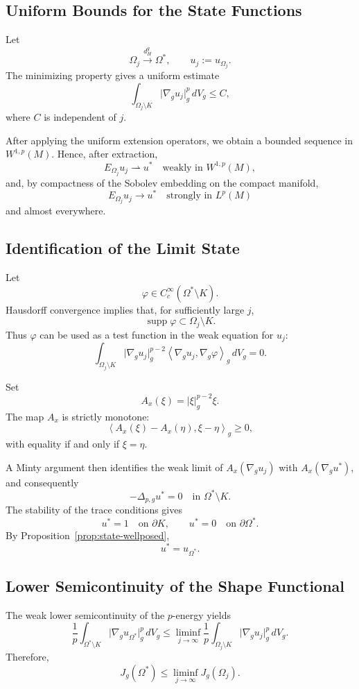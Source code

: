 \documentclass[11pt,a4paper]{article}
\theoremstyle{definition}
\theoremstyle{remark}
\newcommand{\gradg}{\nabla_g}
\newcommand{\plapg}{\Delta_{p,g}}
\newcommand{\normg}[1]{\lvert #1\rvert_g}
\newcommand{\ipg}[2]{\left\langle #1,#2\right\rangle_g}
\begin{document}
\subsection{Uniform Bounds for the State Functions}

Let
\[
\Omega_j\xrightarrow{d_H^g}\Omega^\ast,
\qquad
u_j:=u_{\Omega_j}.
\]
The minimizing property gives a uniform estimate
\begin{equation}
\int_{\Omega_j\setminus K}
\normg{\gradg u_j}^{p}\,dV_g
\leq C,
\label{eq:uniform-energy-bound}
\end{equation}
where $C$ is independent of $j$.

After applying the uniform extension operators, we obtain a bounded
sequence in $W^{1,p}(M)$. Hence, after extraction,
\[
E_{\Omega_j}u_j\rightharpoonup u^\ast
\quad\text{weakly in }W^{1,p}(M),
\]
and, by compactness of the Sobolev embedding on the compact manifold,
\[
E_{\Omega_j}u_j\to u^\ast
\quad\text{strongly in }L^p(M)
\]
and almost everywhere.

\subsection{Identification of the Limit State}

Let
\[
\varphi\in C_c^\infty(\Omega^\ast\setminus K).
\]
Hausdorff convergence implies that, for sufficiently large $j$,
\[
\operatorname{supp}\varphi\subset\Omega_j\setminus K.
\]
Thus $\varphi$ can be used as a test function in the weak equation
for $u_j$:
\[
\int_{\Omega_j\setminus K}
\normg{\gradg u_j}^{p-2}
\ipg{\gradg u_j}{\gradg\varphi}
\,dV_g=0.
\]

Set
\[
A_x(\xi)=\normg{\xi}^{p-2}\xi.
\]
The map $A_x$ is strictly monotone:
\[
\ipg{A_x(\xi)-A_x(\eta)}{\xi-\eta}
\geq0,
\]
with equality if and only if $\xi=\eta$.

A Minty argument then identifies the weak limit of
$A_x(\gradg u_j)$ with $A_x(\gradg u^\ast)$, and consequently
\[
-\plapg u^\ast=0
\quad\text{in }\Omega^\ast\setminus K.
\]
The stability of the trace conditions gives
\[
u^\ast=1\quad\text{on }\partial K,
\qquad
u^\ast=0\quad\text{on }\partial\Omega^\ast.
\]
By Proposition~\ref{prop:state-wellposed},
\[
u^\ast=u_{\Omega^\ast}.
\]

\subsection{Lower Semicontinuity of the Shape Functional}

The weak lower semicontinuity of the $p$-energy yields
\[
\frac1p
\int_{\Omega^\ast\setminus K}
\normg{\gradg u_{\Omega^\ast}}^p\,dV_g
\leq
\liminf_{j\to\infty}
\frac1p
\int_{\Omega_j\setminus K}
\normg{\gradg u_j}^p\,dV_g.
\]
Therefore,
\begin{equation}
J_g(\Omega^\ast)
\leq
\liminf_{j\to\infty}J_g(\Omega_j).
\label{eq:shape-lsc}
\end{equation}
\end{document}
